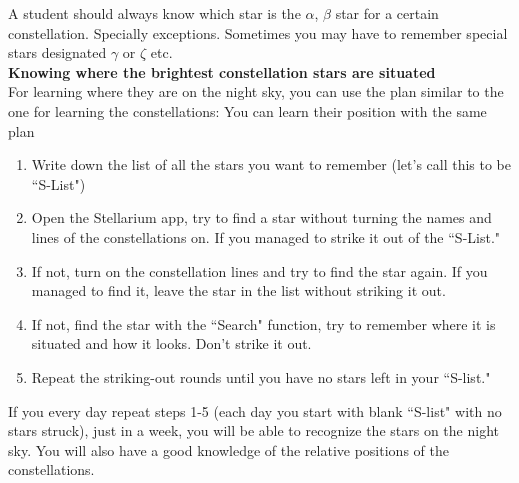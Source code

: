 \documentclass[a4paper,12pt]{extarticle}
\begin{document}
A student should always know which star is the $\alpha$, $\beta$ star for a certain constellation. Specially
exceptions. Sometimes you may have to remember special stars designated $\gamma$ or $\zeta$ etc.\\

\textbf{Knowing where the brightest constellation stars are situated}\\

For learning where they are on the night sky, you can use the plan similar to the one for learning the constellations:
You can learn their position with the same plan

\begin{enumerate}[1.]
	\item  Write down the list of all the stars you want to remember (let's call this to be ``S-List")
	\item Open the Stellarium app, try to find a star without turning the names and lines of the constellations on. If you managed to strike it out of the ``S-List."
	\item If not, turn on the constellation lines and try to find the star again. If you managed to find it, leave the star in the list without striking it out.
	\item If not, find the star with the ``Search" function, try to remember where it is situated and how it looks. Don't strike it out.
	\item  Repeat the striking-out rounds until you have no stars left in your ``S-list."
\end{enumerate}

If you every day repeat steps 1-5 (each day you start with blank ``S-list" with no stars struck), just in a week, you will be able to recognize the stars on the night sky. You will also have a good knowledge of the relative positions of the constellations.
\end{document}
